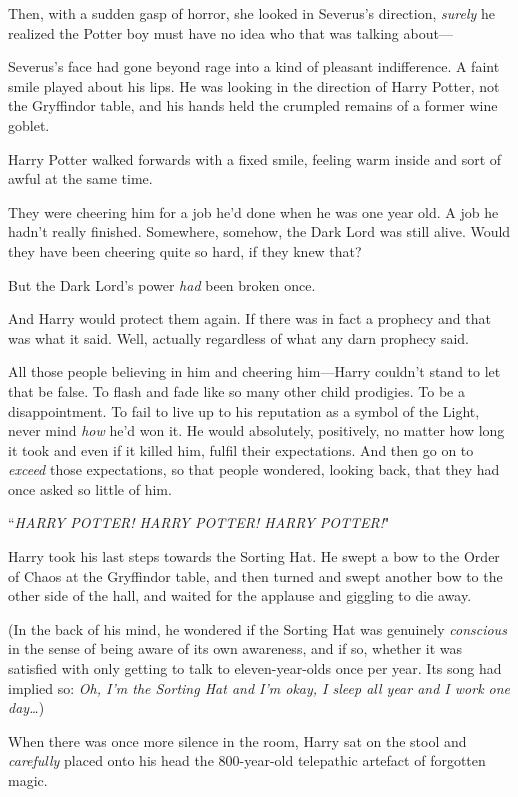 Then, with a sudden gasp of horror, she looked in Severus's direction, \emph{surely} he realized the Potter boy must have no idea who that was talking about—

Severus's face had gone beyond rage into a kind of pleasant indifference. A faint smile played about his lips. He was looking in the direction of Harry Potter, not the Gryffindor table, and his hands held the crumpled remains of a former wine goblet.

\later

Harry Potter walked forwards with a fixed smile, feeling warm inside and sort of awful at the same time.

They were cheering him for a job he'd done when he was one year old. A job he hadn't really finished. Somewhere, somehow, the Dark Lord was still alive. Would they have been cheering quite so hard, if they knew that?

But the Dark Lord's power \emph{had} been broken once.

And Harry would protect them again. If there was in fact a prophecy and that was what it said. Well, actually regardless of what any darn prophecy said.

All those people believing in him and cheering him—Harry couldn't stand to let that be false. To flash and fade like so many other child prodigies. To be a disappointment. To fail to live up to his reputation as a symbol of the Light, never mind \emph{how} he'd won it. He would absolutely, positively, no matter how long it took and even if it killed him, fulfil their expectations. And then go on to \emph{exceed} those expectations, so that people wondered, looking back, that they had once asked so little of him.

``\emph{HARRY POTTER! HARRY POTTER! HARRY POTTER!}"

Harry took his last steps towards the Sorting Hat. He swept a bow to the Order of Chaos at the Gryffindor table, and then turned and swept another bow to the other side of the hall, and waited for the applause and giggling to die away.

(In the back of his mind, he wondered if the Sorting Hat was genuinely \emph{conscious} in the sense of being aware of its own awareness, and if so, whether it was satisfied with only getting to talk to eleven-year-olds once per year. Its song had implied so: \emph{Oh, I'm the Sorting Hat and I'm okay, I sleep all year and I work one day…})

When there was once more silence in the room, Harry sat on the stool and \emph{carefully} placed onto his head the 800-year-old telepathic artefact of forgotten magic.

